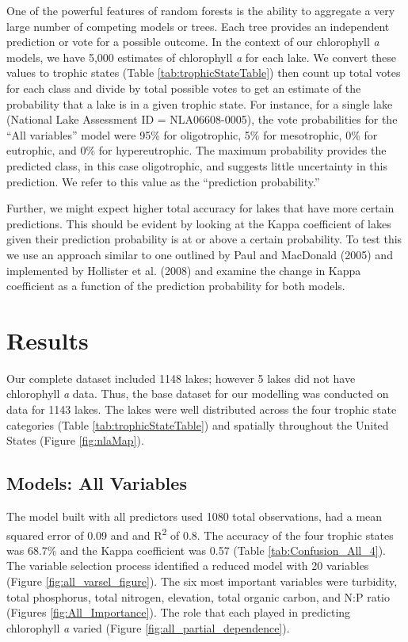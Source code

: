 \documentclass[12pt,]{article}
\begin{document}
One of the powerful features of random forests is the ability to
aggregate a very large number of competing models or trees. Each tree
provides an independent prediction or vote for a possible outcome. In
the context of our chlorophyll \emph{a} models, we have 5,000 estimates
of chlorophyll \emph{a} for each lake. We convert these values to
trophic states (Table \ref {tab:trophicStateTable}) then count up total
votes for each class and divide by total possible votes to get an
estimate of the probability that a lake is in a given trophic state. For
instance, for a single lake (National Lake Assessment ID =
NLA06608-0005), the vote probabilities for the ``All variables'' model
were 95\% for oligotrophic, 5\% for mesotrophic, 0\% for eutrophic, and
0\% for hypereutrophic. The maximum probability provides the predicted
class, in this case oligotrophic, and suggests little uncertainty in
this prediction. We refer to this value as the ``prediction
probability.''

Further, we might expect higher total accuracy for lakes that have more
certain predictions. This should be evident by looking at the Kappa
coefficient of lakes given their prediction probability is at or above a
certain probability. To test this we use an approach similar to one
outlined by Paul and MacDonald (2005) and implemented by Hollister et
al. (2008) and examine the change in Kappa coefficient as a function of
the prediction probability for both models.

\section{Results}\label{results}

Our complete dataset included 1148 lakes; however 5 lakes did not have
chlorophyll \emph{a} data. Thus, the base dataset for our modelling was
conducted on data for 1143 lakes. The lakes were well distributed across
the four trophic state categories (Table \ref{tab:trophicStateTable})
and spatially throughout the United States (Figure \ref{fig:nlaMap}).

\subsection{Models: All Variables}\label{models-all-variables}

The model built with all predictors used 1080 total observations, had a
mean squared error of 0.09 and and R\textsuperscript{2} of 0.8. The
accuracy of the four trophic states was 68.7\% and the Kappa coefficient
was 0.57 (Table \ref{tab:Confusion_All_4}). The variable selection
process identified a reduced model with 20 variables (Figure
\ref{fig:all_varsel_figure}). The six most important variables were
turbidity, total phosphorus, total nitrogen, elevation, total organic
carbon, and N:P ratio (Figures \ref{fig:All_Importance}). The role that
each played in predicting chlorophyll \emph{a} varied (Figure
\ref{fig:all_partial_dependence}).
\end{document}
